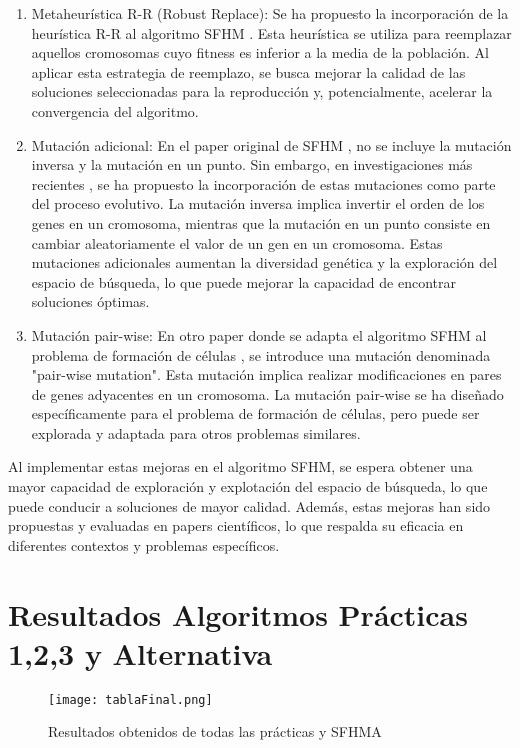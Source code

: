 \begin{enumerate}
	\item Metaheurística R-R (Robust Replace): Se ha propuesto la incorporación de la heurística R-R al algoritmo SFHM \cite{rr}. Esta heurística se utiliza para reemplazar aquellos cromosomas cuyo fitness es inferior a la media de la población. Al aplicar esta estrategia de reemplazo, se busca mejorar la calidad de las soluciones seleccionadas para la reproducción y, potencialmente, acelerar la convergencia del algoritmo.
	\item Mutación adicional: En el paper original de SFHM \cite{ori}, no se incluye la mutación inversa y la mutación en un punto. Sin embargo, en investigaciones más recientes \cite{rr}, se ha propuesto la incorporación de estas mutaciones como parte del proceso evolutivo. La mutación inversa implica invertir el orden de los genes en un cromosoma, mientras que la mutación en un punto consiste en cambiar aleatoriamente el valor de un gen en un cromosoma. Estas mutaciones adicionales aumentan la diversidad genética y la exploración del espacio de búsqueda, lo que puede mejorar la capacidad de encontrar soluciones óptimas.
	\item Mutación pair-wise: En otro paper donde se adapta el algoritmo SFHM al problema de formación de células \cite{pr}, se introduce una mutación denominada "pair-wise mutation". Esta mutación implica realizar modificaciones en pares de genes adyacentes en un cromosoma. La mutación pair-wise se ha diseñado específicamente para el problema de formación de células, pero puede ser explorada y adaptada para otros problemas similares.
\end{enumerate}

Al implementar estas mejoras en el algoritmo SFHM, se espera obtener una mayor capacidad de exploración y explotación del espacio de búsqueda, lo que puede conducir a soluciones de mayor calidad. Además, estas mejoras han sido propuestas y evaluadas en papers científicos, lo que respalda su eficacia en diferentes contextos y problemas específicos.

\section{Resultados Algoritmos Prácticas 1,2,3 y Alternativa}

\begin{figure}[h]
	\centering
	\texttt{[image: tablaFinal.png]}
	\caption{Resultados obtenidos de todas las prácticas y SFHMA}
	\label{fig:final}
\end{figure}

